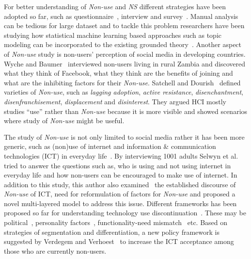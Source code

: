 For better understanding of \emph{Non-use} and \emph{NS} different strategies have been adopted so far, such as questionnaire~\cite{hampton2015social, baker2011their}, interview\cite{turan2013reasons} and survey~\cite{baumer2015missing, brody2018opting}. Manual analysis can be tedious for large dataset and to tackle this problem researchers have been studying how statistical machine learning based approaches such as topic modeling can be incorporated to the existing grounded theory~\cite{baumer2017comparing}. Another aspect of \emph{Non-use} study is non-users' perception of social media in developing countries. Wyche and Baumer~\cite{wyche2017imagined} interviewed non-users living in rural Zambia and discovered what they think of Facebook, what they think are the benefits of joining and what are the inhibiting factors for their \emph{Non-use}. Satchell and Dourish~\cite{satchell2009beyond} defined varieties of \emph{Non-use}, such as \textit{lagging adoption}, \textit{active resistance}, \textit{disenchantment}, \textit{disenfranchisement}, \textit{displacement} and \textit{disinterest}. They argued HCI mostly studies ``use'' rather than \emph{Non-use} because it is more visible and showed scenarios where study of \emph{Non-use} might be useful.

The study of \emph{Non-use} is not only limited to social media rather it has been more generic, such as (non)use of internet and information \& communication technologies (ICT) in everyday life~\cite{selwyn2005whose, selwyn2003apart, verdegem2009profiling, wyatt2003non}. By interviewing 1001 adults Selwyn et al.~\cite{selwyn2005whose} tried to answer the questions such as, who is using and not using internet in everyday life and how non-users can be encouraged to make use of internet. In addition to this study, this author also examined~\cite{selwyn2003apart} the established discourse of \emph{Non-use} of ICT, need for reformulation of factors for \emph{Non-use} and proposed a novel multi-layered model to address this issue. Different frameworks has been proposed so far for understanding technology use discontinuation~\cite{verdegem2009profiling, wyatt2003non, oudshoorn2003users, lapointe2005multilevel, kim2009investigating, marakas1996passive, carroll2002just}. These may be political~\cite{wyatt2003non, oudshoorn2003users}, personality factors~\cite{lapointe2005multilevel, kim2009investigating, marakas1996passive}, functionality-need mismatch~\cite{carroll2002just} etc. Based on strategies of segmentation and differentiation, a new policy framework is suggested by Verdegem and Verhoest~\cite{verdegem2009profiling} to increase the ICT acceptance among those who are currently non-users.  

